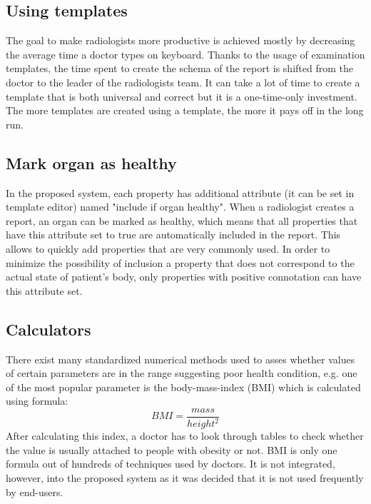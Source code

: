\documentclass[12pt, twoside, openany]{report}
\theoremstyle{definition}
\begin{document}
\subsection{Using templates}
The goal to make radiologists more productive is achieved mostly by decreasing the average time a doctor types on keyboard. Thanks to the usage of examination templates, the time spent to create the schema of the report is shifted from the doctor to the leader of the radiologists team. It can take a lot of time to create a template that is both universal and correct but it is a one-time-only investment. The more templates are created using a template, the more it pays off in the long run.

\subsection{Mark organ as healthy}
In the proposed system, each property has additional attribute (it can be set in template editor) named "include if organ healthy". When a radiologist creates a report, an organ can be marked as healthy, which means that all properties that have this attribute set to true are automatically included in the report. This allows to quickly add properties that are very commonly used. 
In order to minimize the possibility of inclusion a property that does not correspond to the actual state of patient's body, only properties with positive connotation can have this attribute set. 

\subsection{Calculators}
There exist many standardized numerical methods used to asses whether values of certain parameters are in the range suggesting poor health condition, e.g. one of the most popular parameter is the body-mass-index (BMI) which is calculated using formula:
\begin{equation}
BMI=\frac{mass}{height^2}
\end{equation} 
After calculating this index, a doctor has to look through tables to check whether the value is usually attached to people with obesity or not. 
BMI is only one formula out of hundreds of techniques used by doctors. It is not integrated, however, into the proposed system as it was decided that it is not used frequently by end-users.
\end{document}
